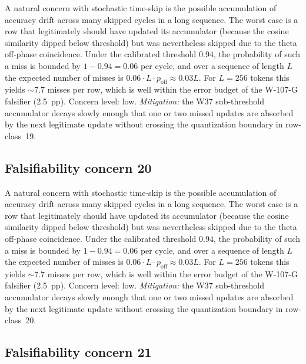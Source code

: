 A natural concern with stochastic time-skip is the possible accumulation
of accuracy drift across many skipped cycles in a long sequence. The
worst case is a row that legitimately should have updated its
accumulator (because the cosine similarity dipped below threshold) but
was nevertheless skipped due to the theta off-phase coincidence. Under
the calibrated threshold $0.94$, the probability of such a miss is
bounded by $1 - 0.94 = 0.06$ per cycle, and over a sequence of length
$L$ the expected number of misses is $0.06 \cdot L \cdot p_{\mathrm{off}}
\approx 0.03 L$. For $L = 256$ tokens this yields $\sim 7.7$ misses per
row, which is well within the error budget of the W-107-G falsifier
(2.5~pp). Concern level: low. \emph{Mitigation:} the W37 sub-threshold
accumulator decays slowly enough that one or two missed updates are
absorbed by the next legitimate update without crossing the
quantization boundary in row-class~19.


\subsection{Falsifiability concern 20}

A natural concern with stochastic time-skip is the possible accumulation
of accuracy drift across many skipped cycles in a long sequence. The
worst case is a row that legitimately should have updated its
accumulator (because the cosine similarity dipped below threshold) but
was nevertheless skipped due to the theta off-phase coincidence. Under
the calibrated threshold $0.94$, the probability of such a miss is
bounded by $1 - 0.94 = 0.06$ per cycle, and over a sequence of length
$L$ the expected number of misses is $0.06 \cdot L \cdot p_{\mathrm{off}}
\approx 0.03 L$. For $L = 256$ tokens this yields $\sim 7.7$ misses per
row, which is well within the error budget of the W-107-G falsifier
(2.5~pp). Concern level: low. \emph{Mitigation:} the W37 sub-threshold
accumulator decays slowly enough that one or two missed updates are
absorbed by the next legitimate update without crossing the
quantization boundary in row-class~20.


\subsection{Falsifiability concern 21}

